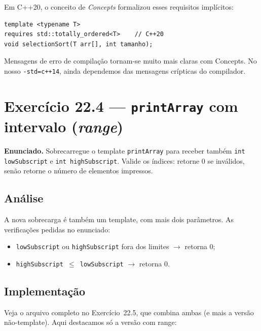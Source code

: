 \documentclass[11pt,a4paper]{article}
\begin{document}
\begin{obseng}
Em C++20, o conceito de \emph{Concepts} formalizou esses requisitos impl\'icitos:

\begin{lstlisting}[style=cppcode,numbers=none]
template <typename T>
requires std::totally_ordered<T>    // C++20
void selectionSort(T arr[], int tamanho);
\end{lstlisting}

Mensagens de erro de compila\c{c}\~ao tornam-se muito mais claras com Concepts. No nosso \texttt{-std=c++14}, ainda dependemos das mensagens cr\'ipticas do compilador.
\end{obseng}

\newpage
\section{Exerc\'icio 22.4 --- \texttt{printArray} com intervalo (\emph{range})}

\begin{enunciado}
\textbf{Enunciado.} Sobrecarregue o template \texttt{printArray} para receber tamb\'em \texttt{int lowSubscript} e \texttt{int highSubscript}. Valide os \'indices: retorne 0 se inv\'alidos, sen\~ao retorne o n\'umero de elementos impressos.
\end{enunciado}

\subsection*{An\'alise}

A nova sobrecarga \'e tamb\'em um template, com mais dois par\^ametros. As verifica\c{c}\~oes pedidas no enunciado:

\begin{itemize}[leftmargin=*,itemsep=0pt]
  \item \texttt{lowSubscript} ou \texttt{highSubscript} fora dos limites $\to$ retorna 0;
  \item \texttt{highSubscript $\leq$ lowSubscript} $\to$ retorna 0.
\end{itemize}

\subsection*{Implementa\c{c}\~ao}

Veja o arquivo completo no Exerc\'icio~22.5, que combina ambas (e mais a vers\~ao n\~ao-template). Aqui destacamos s\'o a vers\~ao com range:
\end{document}
